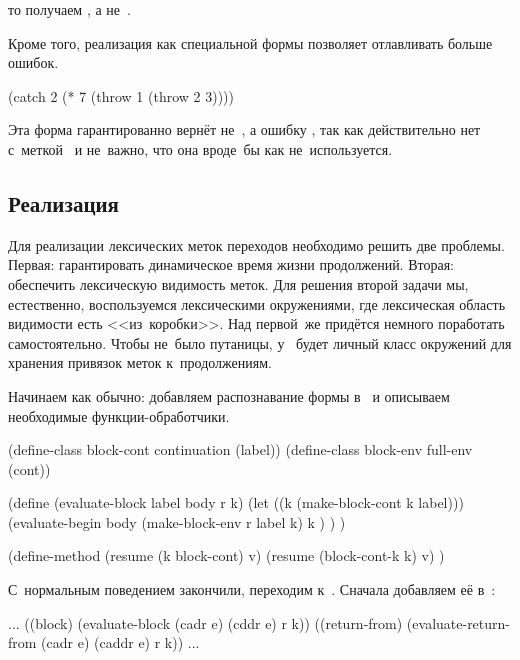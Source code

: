 \noindent
то получаем , а не~.

Кроме того, реализация  как специальной формы позволяет отлавливать
больше ошибок.

\begin{code:lisp}
(catch 2 (* 7 (throw 1 (throw 2 3))))
\end{code:lisp}

\noindent
Эта форма гарантированно вернёт не~, а ошибку ,
так как действительно нет  с~меткой~ и не~важно, что она
вроде~бы как не~используется.


\subsection{\texorpdfstring{Реализация \protect{}}{Реализация block}}%
\label{escape/implementation/ssect:block}

Для реализации лексических меток переходов необходимо решить две проблемы.
Первая: гарантировать динамическое время жизни продолжений. Вторая: обеспечить
лексическую видимость меток. Для решения второй задачи мы, естественно,
воспользуемся лексическими окружениями, где лексическая область видимости есть
<<из~коробки>>. Над первой~же придётся немного поработать самостоятельно. Чтобы
не~было путаницы, у~ будет личный класс окружений для хранения
привязок меток к~продолжениям.

Начинаем как обычно: добавляем распознавание формы  в~ и
описываем необходимые функции-обработчики.

\begin{code:lisp}
(define-class block-cont continuation (label))
(define-class block-env full-env (cont))

(define (evaluate-block label body r k)
  (let ((k (make-block-cont k label)))
    (evaluate-begin body
                    (make-block-env r label k)
                    k ) ) )

(define-method (resume (k block-cont) v)
  (resume (block-cont-k k) v) )
\end{code:lisp}

С~нормальным поведением закончили, переходим к~. Сначала
добавляем её в~:

\begin{code:lisp}
...
((block)       (evaluate-block (cadr e) (cddr e) r k))
((return-from) (evaluate-return-from (cadr e) (caddr e) r k))
...
\end{code:lisp}

